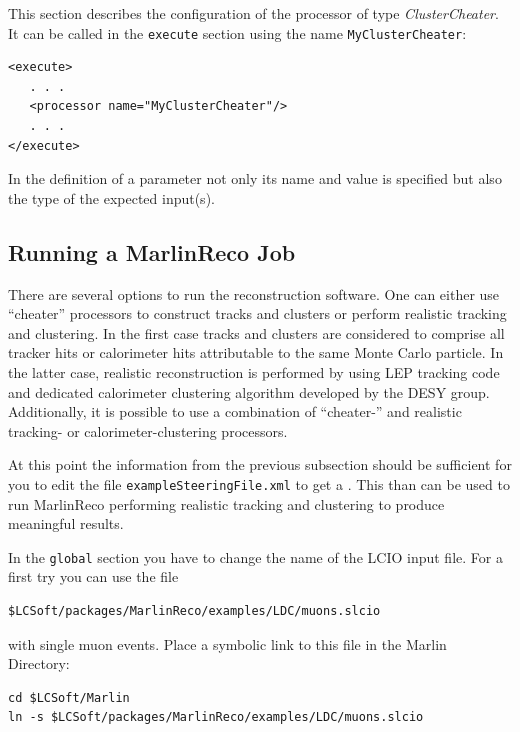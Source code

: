 This section describes the configuration of the processor of type
{\em ClusterCheater}. It can be called in the {\tt execute} section 
using the name {\tt MyClusterCheater}:

\begin{verbatim}
<execute>
   . . .
   <processor name="MyClusterCheater"/>
   . . .
</execute>
\end{verbatim}

In the definition of a parameter not only its name and value is 
specified but also the type of the expected input(s).

\subsection{Running a MarlinReco Job}

There are several options to run the reconstruction software. One can
either use ``cheater'' processors to construct tracks and clusters or
perform realistic tracking and clustering. In the first case tracks
and clusters are considered to comprise all tracker hits or
calorimeter hits attributable to the same Monte Carlo particle. In the
latter case, realistic reconstruction is performed by using LEP
tracking code and dedicated calorimeter
clustering algorithm developed by the DESY group. Additionally, it is
possible to use a combination of ``cheater-'' and realistic tracking- or
calorimeter-clustering processors. 

At this point the information from the previous subsection should be sufficient
for you to edit the file {\tt exampleSteeringFile.xml} to get a 
.
This than can be used to run MarlinReco performing realistic tracking and 
clustering to produce meaningful results. 

In the {\tt global} section you have to change the name of the 
LCIO input file. For a first try you can use the file 

\begin{verbatim}
$LCSoft/packages/MarlinReco/examples/LDC/muons.slcio
\end{verbatim}

with single muon events. Place a symbolic link to this file in the 
Marlin Directory:

\begin{verbatim}
cd $LCSoft/Marlin
ln -s $LCSoft/packages/MarlinReco/examples/LDC/muons.slcio
\end{verbatim} 

